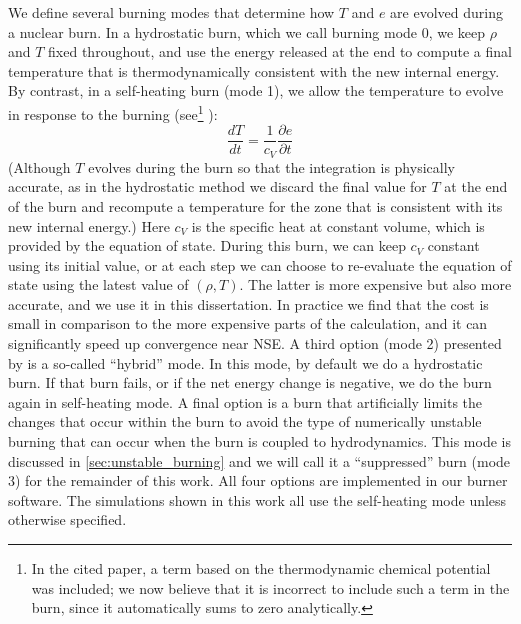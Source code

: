 \documentclass[12pt]{article}
\begin{document}
We define several burning modes that determine how $T$ and $e$ are evolved
during a nuclear burn. In a hydrostatic burn, which we call burning mode 0,
we keep $\rho$ and $T$ fixed throughout, and use
the energy released at the end to compute a final temperature that is
thermodynamically consistent with the new internal energy. By contrast,
in a self-heating burn (mode 1), we allow the temperature to evolve in response
to the burning (see\footnote{In the cited paper, a term based on the
thermodynamic chemical potential was included; we now believe
that it is incorrect to include such a term in the burn, since it
automatically sums to zero analytically.} \citealt{maestro3}):
\begin{equation}
  \frac{dT}{dt} = \frac{1}{c_V}\frac{\partial e}{\partial t}
\end{equation}
(Although $T$ evolves during the burn so that the integration is physically
accurate, as in the hydrostatic method we discard the final value
for $T$ at the end of the burn and recompute a temperature for the zone that is
consistent with its new internal energy.) Here $c_V$ is the specific heat at
constant volume, which is provided by the equation of state.  During this burn,
we can keep $c_V$ constant using its initial value, or at each step we
can choose to re-evaluate the equation of state using the latest value of $(\rho, T)$.
The latter is more expensive but also more accurate, and we use it in this dissertation.
In practice we find that the cost is small in comparison to the more expensive
parts of the calculation, and it can significantly speed up convergence near NSE.
A third option (mode 2) presented by \citet{raskin:2010} is a so-called ``hybrid'' mode.
In this mode, by default we do a hydrostatic burn. If that burn fails, or if the net
energy change is negative, we do the burn again in self-heating mode. A final option
is a burn that artificially limits the changes that occur within the burn to avoid the type of
numerically unstable burning that can occur when the burn is coupled to hydrodynamics.
This mode is discussed in \autoref{sec:unstable_burning} and we will call it a
``suppressed'' burn (mode 3) for the remainder of this work. All four options
are implemented in our burner software. The simulations shown in this work all
use the self-heating mode unless otherwise specified.
\end{document}
